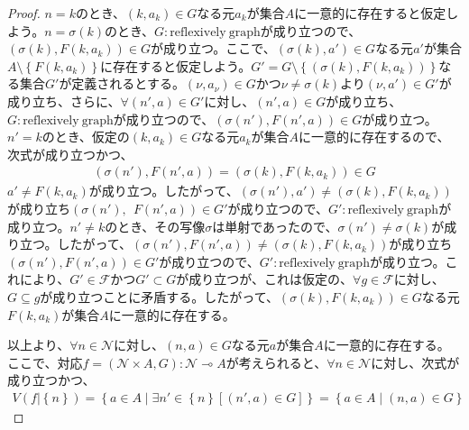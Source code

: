 \documentclass[dvipdfmx]{jsarticle}
\begin{document}
\begin{proof}
$n = k$のとき、$\left( k,a_{k} \right) \in G$なる元$a_{k}$が集合$A$に一意的に存在すると仮定しよう。$n = \sigma(k)$のとき、$G:\mathrm{reflexively\ graph}$が成り立つので、$\left( \sigma(k),F\left( k,a_{k} \right) \right) \in G$が成り立つ。ここで、$\left( \sigma(k),a' \right) \in G$なる元$a'$が集合$A \setminus \left\{ F\left( k,a_{k} \right) \right\}$に存在すると仮定しよう。$G' = G \setminus \left\{ \left( \sigma(k),F\left( k,a_{k} \right) \right) \right\}$なる集合$G'$が定義されるとする。$\left( \nu,a_{\nu} \right) \in G$かつ$\nu \neq \sigma(k)$より$\left( \nu,a' \right) \in G'$が成り立ち、さらに、$\forall\left( n',a \right) \in G'$に対し、$\left( n',a \right) \in G$が成り立ち、$G:\mathrm{reflexively\ graph}$が成り立つので、$\left( \sigma\left( n' \right),F\left( n',a \right) \right) \in G$が成り立つ。$n' = k$のとき、仮定の$\left( k,a_{k} \right) \in G$なる元$a_{k}$が集合$A$に一意的に存在するので、次式が成り立つかつ、
\begin{align*}
\left( \sigma\left( n' \right),F\left( n',a \right) \right) = \left( \sigma(k),F\left( k,a_{k} \right) \right) \in G
\end{align*}
$a' \neq F\left( k,a_{k} \right)$が成り立つ。したがって、$\left( \sigma\left( n' \right),a' \right) \neq \left( \sigma(k),F\left( k,a_{k} \right) \right)$が成り立ち$\left( \sigma\left( n' \right),\ \ F\left( n',a \right) \right) \in G'$が成り立つので、$G':\mathrm{reflexively\ graph}$が成り立つ。$n' \neq k$のとき、その写像$\sigma$は単射であったので、$\sigma\left( n' \right) \neq \sigma(k)$が成り立つ。したがって、$\left( \sigma\left( n' \right),F\left( n',a \right) \right) \neq \left( \sigma(k),F\left( k,a_{k} \right) \right)$が成り立ち$\left( \sigma\left( n' \right),F\left( n',a \right) \right) \in G'$が成り立つので、$G':\mathrm{reflexively\ graph}$が成り立つ。これにより、$G' \in \mathcal{F}$かつ$G' \subset G$が成り立つが、これは仮定の、$\forall g\in \mathcal{F}$に対し、$G \subseteq g$が成り立つことに矛盾する。したがって、$\left( \sigma(k),F\left( k,a_{k} \right) \right) \in G$なる元$F\left( k,a_{k} \right)$が集合$A$に一意的に存在する。\par
以上より、$\forall n \in \mathcal{N}$に対し、$(n,a) \in G$なる元$a$が集合$A$に一意的に存在する。ここで、対応$f = \left( \mathcal{N \times}A,G \right)\mathcal{:N \multimap}A$が考えられると、$\forall n \in \mathcal{N}$に対し、次式が成り立つかつ、
\begin{align*}
V\left( f|\left\{ n \right\} \right) = \left\{ a \in A \middle| \exists n' \in \left\{ n \right\}\left[ \left( n',a \right) \in G \right] \right\} = \left\{ a \in A \middle| (n,a) \in G \right\}

\end{align*}
\end{proof}
\end{document}
